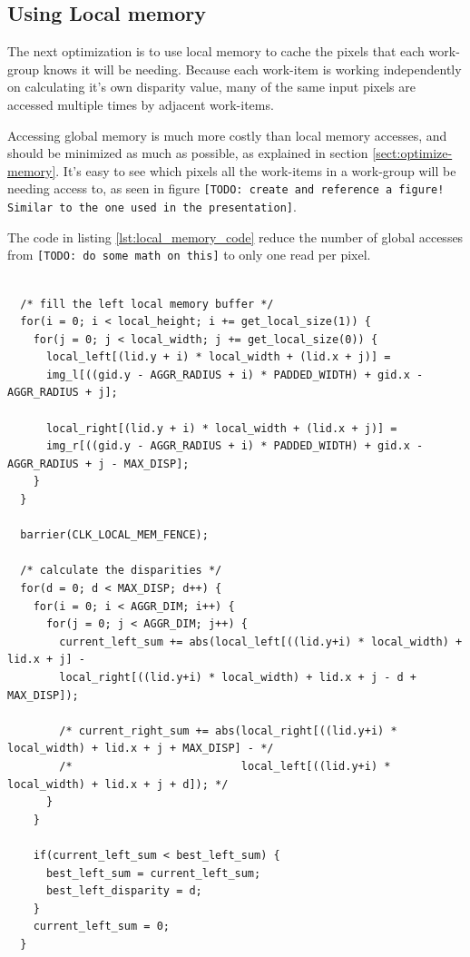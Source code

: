 \subsection{Using Local memory}

The next optimization is to use local memory to cache the pixels that
each work-group knows it will be needing. Because each work-item is
working independently on calculating it's own disparity value, many of
the same input pixels are accessed multiple times by adjacent
work-items.

Accessing global memory is much more costly than local memory
accesses, and should be minimized as much as possible, as explained in
section \ref{sect:optimize-memory}. It's easy to see which pixels all
the work-items in a work-group will be needing access to, as seen in
figure \texttt{[TODO: create and reference a figure! Similar to the
  one used in the presentation]}.

The code in listing \ref{lst:local_memory_code} reduce the number of
global accesses from \texttt{[TODO: do some math on this]} to only one
read per pixel.

\begin{lstlisting}[label={lst:local_memory_code}, caption=Using
  local memory to reduce the number of global memory accesses]

  /* fill the left local memory buffer */
  for(i = 0; i < local_height; i += get_local_size(1)) {
    for(j = 0; j < local_width; j += get_local_size(0)) {
      local_left[(lid.y + i) * local_width + (lid.x + j)] =
      img_l[((gid.y - AGGR_RADIUS + i) * PADDED_WIDTH) + gid.x - AGGR_RADIUS + j];

      local_right[(lid.y + i) * local_width + (lid.x + j)] =
      img_r[((gid.y - AGGR_RADIUS + i) * PADDED_WIDTH) + gid.x - AGGR_RADIUS + j - MAX_DISP];
    }
  }

  barrier(CLK_LOCAL_MEM_FENCE);

  /* calculate the disparities */
  for(d = 0; d < MAX_DISP; d++) {
    for(i = 0; i < AGGR_DIM; i++) {
      for(j = 0; j < AGGR_DIM; j++) {
        current_left_sum += abs(local_left[((lid.y+i) * local_width) + lid.x + j] -
        local_right[((lid.y+i) * local_width) + lid.x + j - d + MAX_DISP]);

        /* current_right_sum += abs(local_right[((lid.y+i) * local_width) + lid.x + j + MAX_DISP] - */
        /*                          local_left[((lid.y+i) * local_width) + lid.x + j + d]); */
      }
    }

    if(current_left_sum < best_left_sum) {
      best_left_sum = current_left_sum;
      best_left_disparity = d;
    }
    current_left_sum = 0;
  }
\end{lstlisting}

